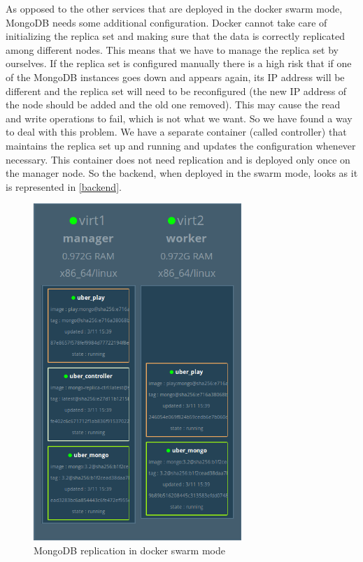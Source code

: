 As opposed to the other services that are deployed in the docker swarm mode, MongoDB needs some additional configuration. Docker cannot take care of initializing the replica set and making sure that the data is correctly replicated among different nodes. This means that we have to manage the replica set by ourselves. If the replica set is configured manually there is a high risk that if one of the MongoDB instances goes down and appears again, its IP address will be different and the replica set will need to be reconfigured (the new IP address of the node should be added and the old one removed). This may cause the read and write operations to fail, which is not what we want. So we have found a way to deal with this problem. We have a separate container (called controller) that maintains the replica set up and running and updates the configuration whenever necessary.  This container does not need replication and is deployed only once on the manager node. So the backend, when deployed in the swarm mode, looks as it is represented in \autoref{backend}.

    \begin{figure}[H]
		\centering
		\includegraphics[width=0.7\textwidth]{images/backend.png}
		\caption{MongoDB replication in docker swarm mode}
		\label{backend}
	\end{figure}


